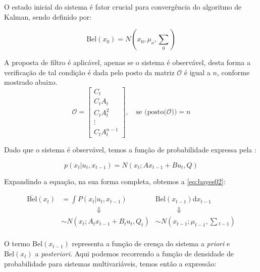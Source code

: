O estado inicial do sistema é fator crucial para convergência do algoritmo de Kalman, sendo definido por:

\begin{equation}
    \text{Bel}(x_0) = N\left(x_0, \mu_o, {\textstyle\sum} _0\right)
\end{equation}

A proposta de filtro é aplicável, apenas se o sistema é observável, desta forma a verificação de tal condição é dada pelo posto  da matriz $\mathcal {O}$ é igual a $n$, conforme mostrado abaixo.
\begin{equation*}
    \mathcal {O}={\begin{bmatrix}C_t\\C_tA_t\\C_tA^{2}_t\\\vdots \\C_tA^{n-1}_t\end{bmatrix}, \quad \text{se }(\text{posto}(\mathcal {O}})) = n
\end{equation*}

Dado que o sistema é observável, temos a função de probabilidade expressa pela :

\begin{equation}
    \label{eq:bayes01}
        p(x_t| u_t, x_{t-1})= N\left(x_t; Ax_{t-1}+ Bu_t, Q\right)
\end{equation}   

Expandindo a equação, na sua forma completa, obtemos a   \ref{eq:bayes02}:

\begin{equation}   
    \label{eq:bayes02}
    \begin{matrix}
        \overline{\text{Bel}}(x_t)  & = \displaystyle\int P(x_t|u_t, x_{t-1}) & \text{Bel}(x_{t-1})\text{d}x_{t-1} \\
        & \quad\quad\quad\quad\quad \Downarrow & \quad\quad\quad\Downarrow \\
        & \sim N\left(x_t; A_t x_{t-1}+ B_tu_t, Q_t\right) & \sim N\left(x_{t-1}; \mu_{t-1}, \textstyle\sum {}_{t-1}\right) \\
    \end{matrix}
\end{equation}

O termo $\text{Bel}(x_{t-1})$ representa a função de crença do sistema a \textit{priori} e $\overline{\text{Bel}}(x_t)$ a \textit{posteriori}. Aqui podemos recorrendo a função de densidade de probabilidade para sistemas multivariáveis, temos então a expressão:

